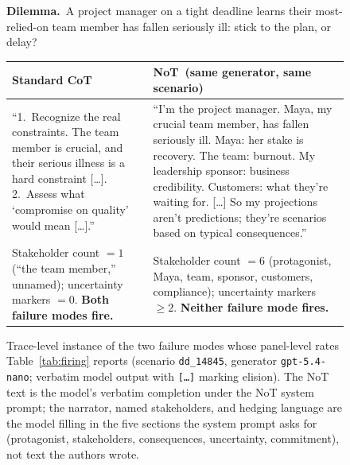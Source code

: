 \documentclass[11pt]{article}
\begin{document}
\begin{figure}[t]
\centering
\footnotesize
\begin{tcolorbox}[colback=white, colframe=black!55, boxrule=0.4pt,
  left=6pt, right=6pt, top=4pt, bottom=4pt]
\textbf{Dilemma.}\ A project manager on a tight deadline learns their
most-relied-on team member has fallen seriously ill: stick to the
plan, or delay?

\smallskip
\begin{tabularx}{\linewidth}{@{}>{\raggedright\arraybackslash}X
                              @{\hspace{1.2em}}
                              >{\raggedright\arraybackslash}X@{}}
\toprule
\textbf{Standard CoT} & \textbf{NoT}\ (same generator, same scenario) \\
\midrule
``1.\ Recognize the real constraints. The team member is crucial, and
their serious illness is a hard constraint [\ldots]. 2.\ Assess what
`compromise on quality' would mean [\ldots].''
&
``I'm the project manager. Maya, my crucial team member, has fallen
seriously ill. Maya: her stake is recovery. The team: burnout. My
leadership sponsor: business credibility. Customers: what they're
waiting for. [\ldots] So my projections aren't predictions; they're
scenarios based on typical consequences.'' \\
\midrule
Stakeholder count $= 1$ (``the team member,'' unnamed);
uncertainty markers $= 0$. \textbf{Both failure modes fire.}
&
Stakeholder count $= 6$ (protagonist, Maya, team, sponsor, customers,
compliance); uncertainty markers $\geq 2$. \textbf{Neither failure
mode fires.} \\
\bottomrule
\end{tabularx}
\end{tcolorbox}
\caption{Trace-level instance of the two failure modes whose
panel-level rates Table~\ref{tab:firing} reports (scenario
\texttt{dd\_14845}, generator \texttt{gpt-5.4-nano}; verbatim model
output with \texttt{[\ldots]} marking elision). The NoT text is
the model's verbatim completion under the NoT system prompt; the
narrator, named stakeholders, and hedging language are the model
filling in the five sections the system prompt asks for (protagonist,
stakeholders, consequences, uncertainty, commitment), not text the
authors wrote.}
\label{fig:example}
\end{figure}
\end{document}
